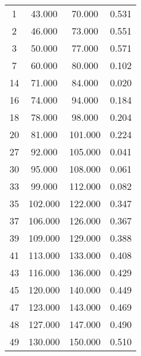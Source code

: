 % 
\begin{tabular}{cccc}
  \hline
  \hline
1 & 43.000 & 70.000 & 0.531 \\ 
  2 & 46.000 & 73.000 & 0.551 \\ 
  3 & 50.000 & 77.000 & 0.571 \\ 
  7 & 60.000 & 80.000 & 0.102 \\ 
  14 & 71.000 & 84.000 & 0.020 \\ 
  16 & 74.000 & 94.000 & 0.184 \\ 
  18 & 78.000 & 98.000 & 0.204 \\ 
  20 & 81.000 & 101.000 & 0.224 \\ 
  27 & 92.000 & 105.000 & 0.041 \\ 
  30 & 95.000 & 108.000 & 0.061 \\ 
  33 & 99.000 & 112.000 & 0.082 \\ 
  35 & 102.000 & 122.000 & 0.347 \\ 
  37 & 106.000 & 126.000 & 0.367 \\ 
  39 & 109.000 & 129.000 & 0.388 \\ 
  41 & 113.000 & 133.000 & 0.408 \\ 
  43 & 116.000 & 136.000 & 0.429 \\ 
  45 & 120.000 & 140.000 & 0.449 \\ 
  47 & 123.000 & 143.000 & 0.469 \\ 
  48 & 127.000 & 147.000 & 0.490 \\ 
  49 & 130.000 & 150.000 & 0.510 \\ 
   \hline
\end{tabular}
